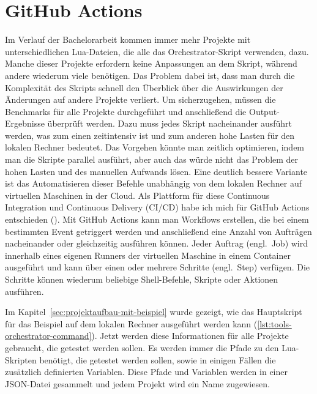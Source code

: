\section{GitHub Actions}\label{sec:github-actions}

Im Verlauf der Bachelorarbeit kommen immer mehr Projekte mit unterschiedlichen Lua-Dateien, die alle das Orchestrator-Skript verwenden, dazu.
Manche dieser Projekte erfordern keine Anpassungen an dem Skript, während andere wiederum viele benötigen.
Das Problem dabei ist, dass man durch die Komplexität des Skripts schnell den Überblick über die Auswirkungen der Änderungen auf andere Projekte verliert.
Um sicherzugehen, müssen die Benchmarks für alle Projekte durchgeführt und anschließend die Output-Ergebnisse überprüft werden.
Dazu muss jedes Skript nacheinander ausführt werden, was zum einen zeitintensiv ist und zum anderen hohe Lasten für den lokalen Rechner bedeutet.
Das Vorgehen könnte man zeitlich optimieren, indem man die Skripte parallel ausführt, aber auch das würde nicht das Problem der hohen Lasten und des manuellen Aufwands lösen.
Eine deutlich bessere Variante ist das Automatisieren dieser Befehle unabhängig von dem lokalen Rechner auf virtuellen Maschinen in der Cloud.
Als Plattform für diese Continuous Integration und Continuous Delivery (CI/CD) habe ich mich für GitHub Actions entschieden (\cite{github_action_doku}).
Mit GitHub Actions kann man Workflows erstellen, die bei einem bestimmten Event getriggert werden und anschließend eine Anzahl von Aufträgen nacheinander oder gleichzeitig ausführen können.
Jeder Auftrag (engl.\ Job) wird innerhalb eines eigenen Runners der virtuellen Maschine in einem Container ausgeführt und kann über einen oder mehrere Schritte (engl.\ Step) verfügen.
Die Schritte können wiederum beliebige Shell-Befehle, Skripte oder Aktionen ausführen.

Im Kapitel~\ref{sec:projektaufbau-mit-beispiel} wurde gezeigt, wie das Hauptskript für das Beispiel auf dem lokalen Rechner ausgeführt werden kann (\ref{lst:tools-orchestrator-command}).
Jetzt werden diese Informationen für alle Projekte gebraucht, die getestet werden sollen.
Es werden immer die Pfade zu den Lua-Skripten benötigt, die getestet werden sollen, sowie in einigen Fällen die zusätzlich definierten Variablen.
Diese Pfade und Variablen werden in einer JSON-Datei gesammelt und jedem Projekt wird ein Name zugewiesen.

\vspace{-8pt}

\vspace{-5pt}

